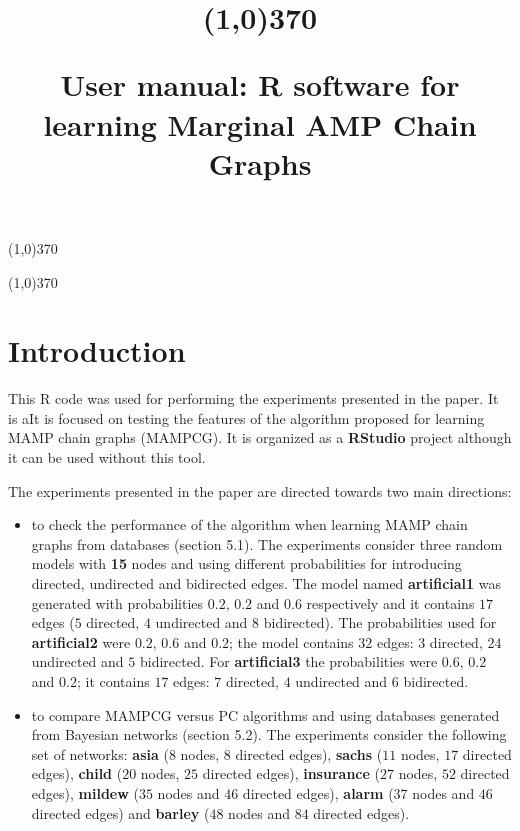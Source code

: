 \documentclass[11pt,professionalfont]{article}
\title{\vspace{-3cm}\begin{center} \line(1,0){370} \\\vspace{0.5cm} \end{center}
User manual: R software for learning Marginal AMP Chain Graphs}
\begin{document}
\maketitle
\vspace{-1.5cm}
\begin{center} \line(1,0){370} \end{center}
\vspace{0.5cm}
\tableofcontents
\begin{center} \line(1,0){370} \end{center}

\section{Introduction}

This R code was used for performing the experiments presented in the
paper. It is aIt is focused on testing the features of the algorithm proposed
for learning MAMP chain graphs (MAMPCG). It is organized as a \textbf{RStudio} 
project although it can be used without this tool. 

\medskip

The experiments presented in the paper are directed towards two main directions:

\begin{itemize}
\item to check the performance of the algorithm when learning MAMP chain 
graphs from databases (section 5.1). The experiments consider three random 
models with \textbf{15} nodes and using different probabilities for introducing 
directed, undirected and bidirected edges. The model named \textbf{artificial1} 
was generated with probabilities $0.2$, $0.2$ and $0.6$ respectively and it 
contains $17$ edges ($5$ directed, $4$ undirected and $8$ bidirected). The 
probabilities used for \textbf{artificial2} were $0.2$, $0.6$ and $0.2$; the 
model contains $32$ edges: $3$ directed, $24$ undirected and $5$ bidirected. 
For \textbf{artificial3} the probabilities were $0.6$, $0.2$ and $0.2$; it 
contains $17$ edges: $7$ directed, $4$ undirected and $6$ bidirected.

\item to compare MAMPCG versus PC algorithms and using databases generated 
from Bayesian networks (section 5.2). The experiments consider the following 
set of networks: \textbf{asia} ($8$ nodes, $8$ directed edges), \textbf{sachs} 
($11$ nodes, $17$ directed edges), \textbf{child} ($20$ nodes,  $25$ directed 
edges), \textbf{insurance} ($27$ nodes, $52$ directed edges), \textbf{mildew} 
($35$ nodes and $46$ directed edges), \textbf{alarm} ($37$ nodes and $46$ 
directed edges) and \textbf{barley} ($48$ nodes and $84$ directed edges).
\end{itemize}
\end{document}
